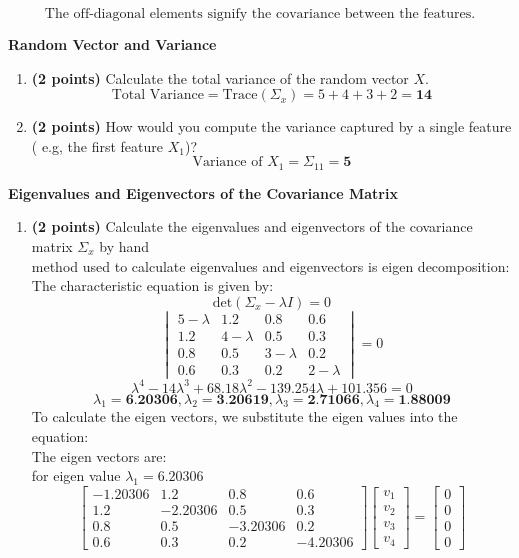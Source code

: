 \documentclass[a3paper,12pt]{extarticle} %
\begin{document}
\begin{enumerate}
\begin{enumerate}
        \[
            \text{The off-diagonal elements signify the covariance between the features.}
        \]
    \end{enumerate}
    \subitem \textbf{Random Vector and Variance}
    \begin{enumerate}
        \item \textbf{(2 points)} Calculate the total variance of the random vector \(X\).
        \[
        \text{Total Variance} = \text{Trace}(\Sigma_x) = 5 + 4 + 3 + 2 = \textbf{14}
        \]
        \item \textbf{(2 points)} How would you compute the variance captured by a single feature ( e.g, the first feature \(X_1\))?
        \[
        \text{Variance of } X_1 = \Sigma_{11} = \textbf{5}
        \]
    \end{enumerate}
    \subitem \textbf{Eigenvalues and Eigenvectors of the Covariance Matrix}
    \begin{enumerate}
        \item \textbf{(2 points)} Calculate the eigenvalues and eigenvectors of the covariance matrix  \(\Sigma_x\) by hand
        \\ method used to calculate eigenvalues and eigenvectors is eigen decomposition:
        \\ The characteristic equation is given by:
        \[
        \text{det}(\Sigma_x - \lambda I) = 0
        \]
        \[
        \begin{vmatrix}5-\lambda & 1.2 & 0.8 & 0.6\\1.2 & 4-\lambda & 0.5 & 0.3\\0.8 & 0.5 & 3-\lambda & 0.2\\0.6 & 0.3 & 0.2 & 2-\lambda\end{vmatrix} = 0
        \]
        \[
            \lambda^4 - 14\lambda^3 + 68.18\lambda^2 - 139.254\lambda + 101.356 = 0
        \]
        \[
            \lambda_1 = \textbf{6.20306}, \lambda_2 = \textbf{3.20619}, \lambda_3 = \textbf{2.71066}, \lambda_4 = \textbf{1.88009}
        \]
        To calculate the eigen vectors, we substitute the eigen values into the equation:
        \\ The eigen vectors are:
        \\ for eigen value \(\lambda_1 = 6.20306\)
        \[
        \begin{bmatrix}-1.20306 & 1.2 & 0.8 & 0.6\\1.2 & -2.20306 & 0.5 & 0.3\\0.8 & 0.5 & -3.20306 & 0.2\\0.6 & 0.3 & 0.2 & -4.20306\end{bmatrix} \begin{bmatrix}v_1\\v_2\\v_3\\v_4\end{bmatrix} = \begin{bmatrix}0\\0\\0\\0\end{bmatrix}
\]
\end{enumerate}
\end{enumerate}
\end{document}
